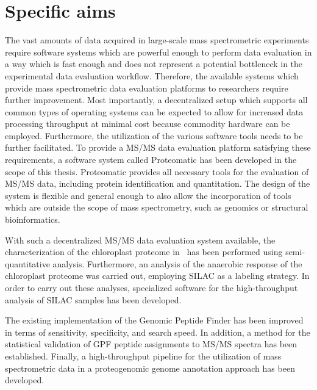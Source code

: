 \cleardoublepage
\chapter{Specific aims}

The vast amounts of data acquired in large-scale mass spectrometric experiments
require software systems which are powerful enough to perform data evaluation
in a way which is fast enough and does not represent a potential bottleneck in 
the experimental data evaluation workflow.
Therefore, the available systems which provide mass spectrometric data 
evaluation platforms to researchers require further improvement.
Most importantly, a decentralized setup which supports all common types of 
operating systems can be expected to allow for increased data processing 
throughput at minimal cost because commodity hardware can be employed.
Furthermore, the utilization of the various software tools needs to be further 
facilitated.
To provide a MS/MS data evaluation platform satisfying these requirements,
a software system called Proteomatic has been developed in the scope of this 
thesis.
Proteomatic provides all necessary tools for the evaluation of MS/MS data, 
including protein identification and quantitation.
The design of the system is flexible and general enough to also
allow the incorporation of tools which are outside the scope of mass 
spectrometry, such as genomics or structural bioinformatics.

With such a decentralized MS/MS data evaluation system available, the
characterization of the chloroplast proteome in \cre~has been performed using
semi-quantitative analysis.
Furthermore, an analysis of the anaerobic response of the chloroplast proteome
was carried out, employing SILAC as a labeling strategy.
In order to carry out these analyses, specialized software for the 
high-throughput analysis of SILAC samples has been developed.

The existing implementation of the Genomic Peptide Finder has been
improved in terms of sensitivity, specificity, and search speed.
In addition, a method for the statistical validation of GPF peptide 
assignments to MS/MS spectra has been established.
Finally, a high-throughput pipeline for the utilization of mass spectrometric 
data in a proteogenomic genome annotation approach has been developed.
